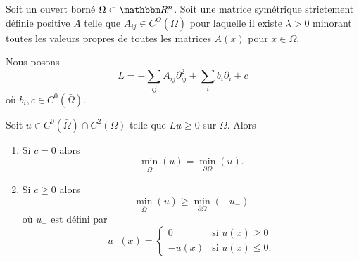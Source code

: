 \begin{lemma}        \label{LEMooDVUYooHEkrsL}
    Soit un ouvert borné \( \Omega\subset \eR^n\). Soit une matrice symétrique strictement définie positive \( A\) telle que \( A_{ij}\in C^O(\bar \Omega)\) pour laquelle il existe \( \lambda>0\) minorant toutes les valeurs propres de toutes les matrices \( A(x)\) pour \( x\in \Omega\).

    Nous posons
    \begin{equation}
        L=-\sum_{ij}A_{ij}\partial^2_{ij}+\sum_ib_i\partial_i+c
    \end{equation}
    où \( b_i,c\in C^0(\bar \Omega)\).

    Soit \( u\in C^0(\bar \Omega)\cap C^2(\Omega)\) telle que \( Lu\geq 0\) sur \( \Omega\). Alors
    \begin{enumerate}
        \item       \label{ITEMooZNUVooNGPXVc}
            Si \( c=0\) alors
            \begin{equation}        \label{EQooOJRWooIMemRN}
                \min_{\bar \Omega}(u)=\min_{\partial\Omega}(u).
            \end{equation}
        \item       \label{ITEMooQOQIooJqTzdA}
            Si \( c\geq 0\) alors
            \begin{equation}        \label{EQooGSXVooGUnRnt}
                \min_{\bar\Omega}(u)\geq \min_{\partial\Omega}(-u_-)
            \end{equation}
            où \( u_-\) est défini par
            \begin{equation}
                u_-(x)=\begin{cases}
                    0    &   \text{si } u(x)\geq 0\\
                    -u(x)    &    \text{si }u(x)\leq 0.
                \end{cases}
            \end{equation}
    \end{enumerate}
\end{lemma}

